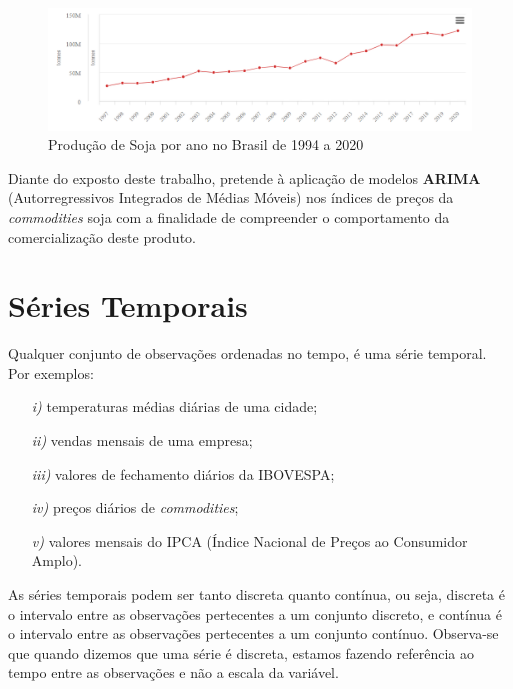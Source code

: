 \documentclass[
	12pt,				%
	openright,			%
	oneside,      %
	a4paper,			%
	english,			%
	french,				%
	spanish,			%
	brazil,				%
	]{abntex2}\usepackage[]{graphicx}\usepackage[table]{xcolor}
\theoremstyle{definition}
\theoremstyle{remark}
\begin{document}
\begin{figure}
  \caption{\label{imagen2}Produção de Soja por ano no Brasil de 1994 a 2020}
    \begin{center}
      \includegraphics[scale = 0.7]{image/img2.png}
    \end{center}
\end{figure}


Diante do exposto deste trabalho, pretende à aplicação de modelos \textbf{ARIMA} (Autorregressivos Integrados de Médias Móveis) nos índices de preços da \textit{commodities} soja com a finalidade de compreender o comportamento da 
comercialização deste produto.


\chapter{Séries Temporais}
  
Qualquer conjunto de observações ordenadas no tempo, é uma série temporal. Por exemplos:

\begin{itemize}
  \item[\textit{i)}] temperaturas médias diárias de uma cidade;
  \item[\textit{ii)}] vendas mensais de uma empresa;
  \item[\textit{iii)}] valores de fechamento diários da IBOVESPA;
  \item[\textit{iv)}] preços diários de \textit{commodities};
  \item[\textit{v)}] valores mensais do IPCA (Índice Nacional de Preços ao Consumidor Amplo).
\end{itemize}

As séries temporais podem ser tanto discreta quanto contínua, ou seja, discreta é o 
intervalo entre as observações pertecentes a um conjunto discreto, e contínua é o 
intervalo entre as observações pertecentes a um conjunto contínuo. Observa-se que 
quando dizemos que uma série é discreta, estamos fazendo referência ao tempo entre as 
observações e não a escala da variável.
\end{document}

